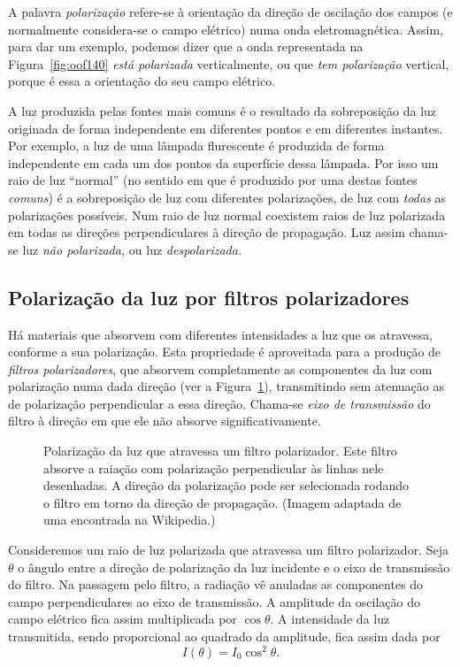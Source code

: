 A palavra \emph{polarização} refere-se à orientação da direção de oscilação dos
campos (e normalmente considera-se o campo elétrico) numa onda eletromagnética.
Assim, para dar um exemplo, podemos dizer que a onda representada na
Figura~\ref{fig:oof140} \emph{está polarizada} verticalmente, ou que
\emph{tem polarização} vertical, porque é essa a orientação do seu campo
elétrico.

A luz produzida pelas fontes mais comuns é o resultado da sobreposição da luz
originada de forma independente em diferentes pontos e em diferentes instantes.
Por exemplo, a luz de uma lâmpada flurescente é produzida de forma independente
em cada um dos pontos da superfície dessa lâmpada. Por isso um raio de luz
``normal'' (no sentido em que é produzido por uma destas fontes \emph{comuns}) é
a sobreposição de luz com diferentes polarizações, de luz com \emph{todas} as
polarizações possíveis. Num raio de luz normal coexistem raios de luz polarizada
em todas as direções perpendiculares à direção de propagação. Luz assim
chama-se luz \emph{não polarizada,} ou luz \emph{despolarizada.}


\subsection{Polarização da luz por filtros polarizadores}
Há materiais que absorvem com diferentes intensidades a luz que os atravessa,
conforme a sua polarização. Esta propriedade é aproveitada para a produção de
\emph{filtros polarizadores}, que absorvem completamente as componentes da luz
com polarização numa dada direção (ver a Figura~\ref{fig:oof150}), transmitindo
sem atenuação as de polarização perpendicular a essa direção. Chama-se
\emph{eixo de transmissão} do filtro à direção em que ele não absorve 
significativamente.
\begin{figure}[htb]
    {\centering


    }
    \caption{Polarização da luz que atravessa um filtro polarizador. Este filtro
        absorve a raiação com polarização perpendicular às linhas nele
        desenhadas. A direção da polarização pode ser selecionada rodando o
        filtro em torno da direção de propagação. (Imagem adaptada de uma
        encontrada na Wikipedia.)\label{fig:oof150}}
\end{figure}

Consideremos um raio de luz polarizada que atravessa um filtro polarizador. Seja
$\theta$ o ângulo entre a direção de polarização da luz incidente e o eixo de
transmissão do filtro. Na passagem pelo filtro, a radiação vê anuladas as
componentes do campo perpendiculares ao eixo de transmissão. A amplitude da
oscilação do campo elétrico fica assim multiplicada por $\cos\theta$. A
intensidade da luz transmitida, sendo proporcional ao quadrado da amplitude,
fica assim dada por
\begin{equation*}
    I(\theta) = I_0\cos^2\theta.
\end{equation*}


